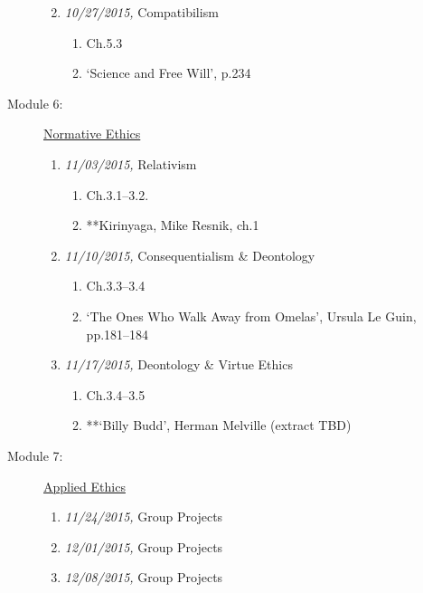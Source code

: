 \documentclass[article,oneside]{memoir}
\begin{document}
\begin{description}
\begin{enumerate}
\begin{enumerate}
\end{enumerate}

\item \textit{10/27/2015,} Compatibilism
\begin{enumerate}
\item Ch.5.3
\item `Science and Free Will', p.234
\end{enumerate}
\end{enumerate}

\item[Module 6:] \href{http://scoconno.github.io/Teaching/Examined/Ethics/}{Normative Ethics}
\begin{enumerate}

\item \textit{11/03/2015,}  Relativism
\begin{enumerate}
\item Ch.3.1--3.2.
\item **Kirinyaga, Mike Resnik, ch.1
\end{enumerate}
\item \textit{11/10/2015,}  Consequentialism \& Deontology
\begin{enumerate}
\item Ch.3.3--3.4
\item  `The Ones Who Walk Away from Omelas', Ursula Le Guin, pp.181--184 
\end{enumerate}
\item \textit{11/17/2015,} Deontology \& Virtue Ethics
\begin{enumerate}
\item Ch.3.4--3.5
\item **`Billy Budd', Herman Melville (extract TBD)
\end{enumerate}
\end{enumerate}

\item[Module 7:] \href{http://scoconno.github.io/Teaching/Examined/Applied/}{Applied Ethics}
\begin{enumerate}
\item \textit{11/24/2015,} Group Projects
\item \textit{12/01/2015,} Group Projects
\item \textit{12/08/2015,} Group Projects
\end{enumerate}

\end{description}
\end{document}
